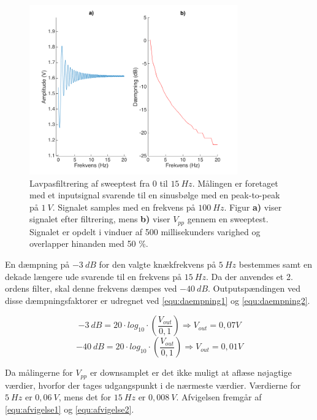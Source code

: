 \begin{figure}[H]
\centering
\includegraphics[width=0.8\textwidth]{figures/Lavpass_test}
\caption{Lavpasfiltrering af sweeptest fra 0 til $15~Hz$. Målingen er foretaget med et inputsignal svarende til en sinusbølge med en peak-to-peak på $1~V$. Signalet samples med en frekvens på $100~Hz$. Figur \textbf{a)} viser signalet efter filtrering, mens \textbf{b)} viser $V_{pp}$ gennem en sweeptest. Signalet er opdelt i vinduer af 500 millisekunders varighed og overlapper hinanden med 50 \%.}
\label{fig:lavps_sweep}
\end{figure}

\noindent
En dæmpning på $-3~dB$ for den valgte knækfrekvens på $5~Hz$ bestemmes samt en dekade længere ude svarende til en frekvens på $15~Hz$. Da der anvendes et 2. ordens filter, skal denne frekvens dæmpes ved $-40~dB$. Outputspændingen ved disse dæmpningsfaktorer er udregnet ved \autoref{equ:daempning1} og \autoref{equ:daempning2}. 

\begin{equation} \label{equ:daempning1}
-3~dB = 20 \cdot log_{10} \cdot (\frac{V_{out}}{0,1}) \Rightarrow V_{out} = 0,07 V
\end{equation}
\begin{equation} \label{equ:daempning2}
-40~dB = 20 \cdot log_{10} \cdot (\frac{V_{out}}{0,1}) \Rightarrow V_{out} = 0,01 V
\end{equation}

\noindent
Da målingerne for $V_{pp}$ er downsamplet er det ikke muligt at aflæse nøjagtige værdier, hvorfor der tages udgangspunkt i de nærmeste værdier. Værdierne for $5~Hz$ er $0,06~V$, mens det for $15~Hz$ er $0,008~V$. Afvigelsen fremgår af \autoref{equ:afvigelse1} og \autoref{equ:afvigelse2}.


